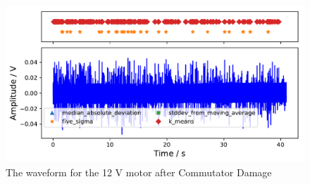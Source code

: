 \begin{figure}[t]
    \includegraphics[width=1.0\textwidth]{fig/12V_hammer_motornorm12V.pdf}
    \caption[Anomaly Tests 12 V Commutator Damage]{The waveform for the 12 V motor after Commutator Damage}
    \label{fig:12V_Hammer}
\end{figure}


